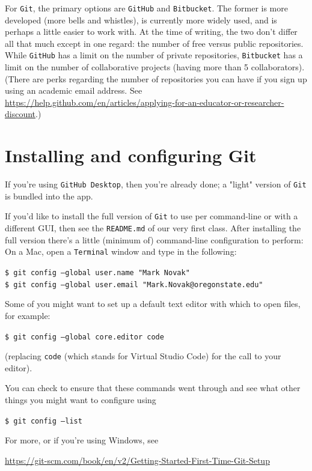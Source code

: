 \documentclass[12pt,letterpaper]{article}
\begin{document}
For \texttt{Git}, 
the primary options are \texttt{GitHub} and \texttt{Bitbucket}.
The former is more developed (more bells and whistles), 
is currently more widely used, 
and is perhaps a little easier to work with.
At the time of writing,
the two don't differ all that much except in one regard:  
the number of free versus public repositories.
While \texttt{GitHub} has a limit on the number of private repositories, 
\texttt{Bitbucket} has a limit on the number of collaborative projects
(having more than 5 collaborators).
(There are perks regarding the number of repositories you can have if you sign up using an academic email address.  
See \url{https://help.github.com/en/articles/applying-for-an-educator-or-researcher-discount}.)



\section{Installing and configuring Git}

If you're using \texttt{GitHub Desktop}, then you're already done;
a "light" version of \texttt{Git} is bundled into the app.

If you'd like to install the full version of \texttt{Git} to use per command-line or with a different GUI, then see the \texttt{README.md} of our very first class.  
After installing the full version there's a little (minimum of) command-line configuration to perform:
On a Mac, open a \texttt{Terminal} window and type in the following:

\noindent
     \texttt{\$ git config --global user.name "Mark Novak"}\\
     \texttt{\$ git config --global user.email "Mark.Novak@oregonstate.edu"}

\noindent
Some of you might want to set up a default text editor with which to open files,
for example:

\noindent
	\texttt{\$ git config --global core.editor code}

\noindent
(replacing \texttt{code} (which stands for Virtual Studio Code) for the call to your editor).

You can check to ensure that these commands went through and see what other things you might want to configure using

\noindent
\texttt{\$ git config --list}

\noindent
For more, or if you're using Windows, see\\
\begin{footnotesize}
\url{https://git-scm.com/book/en/v2/Getting-Started-First-Time-Git-Setup}
\end{footnotesize}
\end{document}
